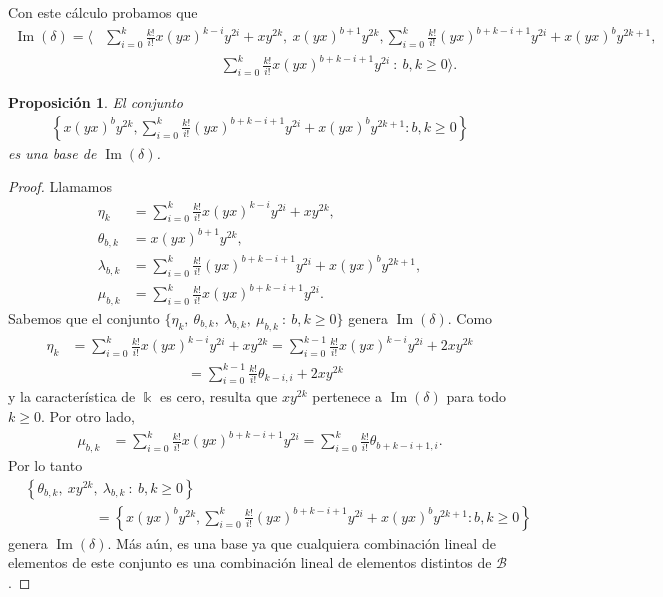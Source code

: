 \documentclass[a4paper,oneside,fleqn,11pt]{article}
\newcommand\field{\Bbbk}
\newcommand\base{\mathcal{B}}
\newtheorem{prop}{Proposición}
\numberwithin{prop}{subsection}
\DeclareMathOperator\Ima{Im}
\begin{document}
Con este cálculo probamos que
\begin{align*}
	\Ima(\delta) = \Bigg\langle &\sum_{i = 0}^k\frac{k!}{i!}x(yx)^{k - i}y^{2i} + xy^{2k},\ x(yx)^{b + 1}y^{2k},
		 \sum_{i = 0}^k\frac{k!}{i!}(yx)^{b + k - i + 1}y^{2i} + x(yx)^by^{2k + 1}, \\
		&\hspace{100pt}\sum_{i = 0}^k\frac{k!}{i!}x(yx)^{b + k - i + 1}y^{2i}\ :\ b,k \geq 0	\Bigg\rangle.
\end{align*}
\begin{prop}
\label{imdelta}
El conjunto
\begin{align*}
		\left\{ x(yx)^by^{2k},
			\sum_{i = 0}^k\frac{k!}{i!}(yx)^{b + k - i + 1}y^{2i} + x(yx)^by^{2k + 1} :b, k \geq 0 \right\}
\end{align*}
es una base de $\Ima(\delta)$.
\end{prop}
\begin{proof}
Llamamos
\begin{align*}
	\eta_k &=  \sum_{i = 0}^k\frac{k!}{i!}x(yx)^{k - i}y^{2i} + xy^{2k}, \\
	\theta_{b,k} &= x(yx)^{b + 1}y^{2k},\\
	\lambda_{b,k} &= \sum_{i = 0}^k\frac{k!}{i!}(yx)^{b + k - i + 1}y^{2i} + x(yx)^by^{2k + 1}, \\
	\mu_{b,k} &= \sum_{i = 0}^k\frac{k!}{i!}x(yx)^{b + k - i + 1}y^{2i}.
\end{align*}
Sabemos que el conjunto $\{\eta_k,\ \theta_{b,k},\ \lambda_{b,k},\ \mu_{b,k}\ :\ b,k \geq 0\}$ genera $\Ima(\delta)$.
Como
\begin{align*}
	\eta_k &= \sum_{i = 0}^{k}\frac{k!}{i!}x(yx)^{k - i}y^{2i} + xy^{2k}
		= \sum_{i = 0}^{k-1}\frac{k!}{i!}x(yx)^{k - i}y^{2i} + 2xy^{2k} \\
	&\hspace{100pt}= \sum_{i = 0}^{k -1}\frac{k!}{i!}\theta_{k - i, i} + 2xy^{2k}
\end{align*}
y la característica de $\field$ es cero, resulta que $xy^{2k}$ pertenece a $\Ima(\delta)$ para todo $k \geq 0$. Por otro lado,
\begin{align*}
	\mu_{b,k} &= \sum_{i = 0}^k\frac{k!}{i!}x(yx)^{b + k - i + 1}y^{2i}
		= \sum_{i = 0}^k\frac{k!}{i!}\theta_{b + k - i + 1, i}.
\end{align*}
Por lo tanto
\begin{align*}
	&\left\{\theta_{b,k},\ xy^{2k},\ \lambda_{b,k}\ :\ b,k \geq 0 \right\} \\
	&\hspace{60pt}= \left\{ x(yx)^by^{2k},
			\sum_{i = 0}^k\frac{k!}{i!}(yx)^{b + k - i + 1}y^{2i} + x(yx)^by^{2k + 1} :b, k \geq 0 \right\}
\end{align*}
genera $\Ima(\delta)$. Más aún, es una base ya que cualquiera combinación lineal de elementos de este conjunto es una
combinación lineal de elementos distintos de $\base$.
\end{proof}
\end{document}
